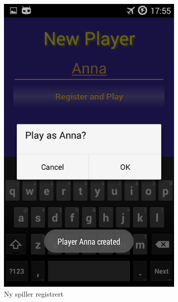 \begin{figure}[ht]
\begin{subfigure}[b]{0.3\textwidth}
        \includegraphics[width=\textwidth]{./img/bruksanvisning/3.png}
        \caption{Ny spiller registrert}
        \label{fig:ny_spiller}
    \end{subfigure}
    \begin{subfigure}[b]{0.3\textwidth}

\end{subfigure}
\end{figure}
